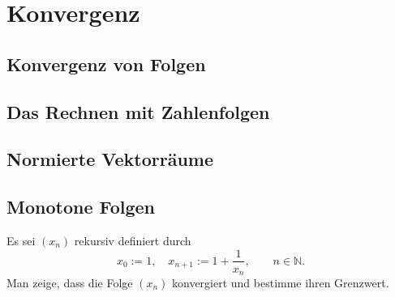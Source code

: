 \chapter{Konvergenz}
\section{Konvergenz von Folgen}
\section{Das Rechnen mit Zahlenfolgen}
\section{Normierte Vektorräume}
\section{Monotone Folgen}
\setcounter{aufgabe}{7}
\begin{aufgabe}
Es sei $(x_n)$ rekursiv definiert durch
\[
x_0 := 1, \quad x_{n+1} := 1 + \frac{1}{x_n}, \qquad n \in \mathbb N .
\]
Man zeige, dass die Folge $(x_n)$ konvergiert und bestimme ihren Grenzwert.
\end{aufgabe}
